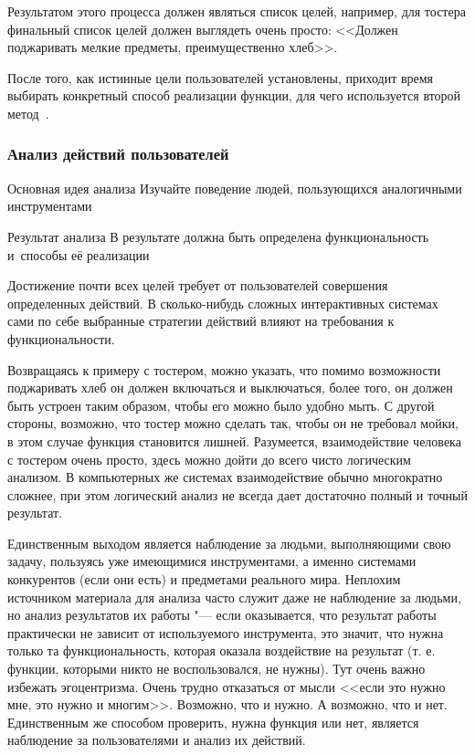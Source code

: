 \documentclass{../industrial-development}
\begin{document}
Результатом этого процесса должен являться список целей, например, для тостера финальный список целей должен выглядеть очень просто: <<Должен поджаривать мелкие предметы, преимущественно хлеб>>.

После того, как истинные цели пользователей установлены, приходит время выбирать конкретный способ реализации функции, для чего используется второй метод~\cite[с.~112--113]{Golovach}.

\begin{frame} \frametitle{Анализ действий пользователей}
  \begin{block}{Основная идея анализа}
    Изучайте поведение людей, пользующихся аналогичными инструментами
  \end{block}
  \begin{block}{Результат анализа}
    В результате должна быть определена функциональность и~способы её реализации
  \end{block}
\end{frame}

\lecturenotes

Достижение почти всех целей требует от пользователей совершения определенных действий. В сколько-нибудь сложных интерактивных системах сами по себе выбранные стратегии действий влияют на требования к функциональности.

Возвращаясь к примеру с тостером, можно указать, что помимо возможности поджаривать хлеб он должен включаться и выключаться, более того, он должен быть устроен таким образом, чтобы его можно было удобно мыть. С другой стороны, возможно, что тостер можно сделать так, чтобы он не требовал мойки, в этом случае функция становится лишней. Разумеется, взаимодействие человека с тостером очень просто, здесь можно дойти до всего чисто логическим анализом. В компьютерных же системах взаимодействие обычно многократно сложнее, при этом логический анализ не всегда дает достаточно полный и точный результат.

Единственным выходом является наблюдение за людьми, выполняющими свою задачу, пользуясь уже имеющимися инструментами, а именно системами конкурентов (если они есть) и предметами реального мира. Неплохим источником материала для анализа часто служит даже не наблюдение за людьми, но анализ результатов их работы "--- если оказывается, что результат работы практически не зависит от используемого инструмента, это значит, что нужна только та функциональность, которая оказала воздействие на результат (т. е. функции, которыми никто не воспользовался, не нужны). Тут очень важно избежать эгоцентризма. Очень трудно отказаться от мысли <<если это нужно мне, это нужно и многим>>. Возможно, что и нужно. А возможно, что и нет. Единственным же способом проверить, нужна функция или нет, является наблюдение за пользователями и анализ их действий.
\end{document}
